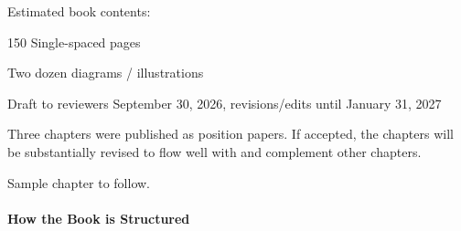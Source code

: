 Estimated book contents:
\begin{itemize*}
  \item 150 Single-spaced pages
  \item Two dozen diagrams / illustrations
  \item Draft to reviewers September 30, 2026, revisions/edits until
    January 31, 2027
\end{itemize*}

Three chapters were published as position papers.  If accepted, the
chapters will be substantially revised to flow well with and
complement other chapters.

Sample chapter to follow.

\paragraph{How the Book is Structured}




